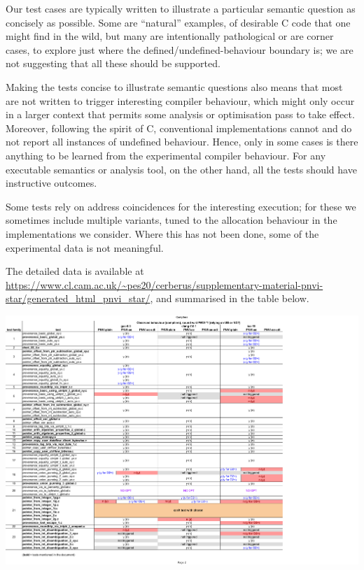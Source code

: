 \documentclass[acmsmall,review,screen]{acmart}\settopmatter{printfolios=true,printccs=false,printacmref=false}
\begin{document}
Our test cases are typically written to illustrate a particular
semantic question as concisely as possible. Some are ``natural''
examples, of desirable C code that one might find in the wild, but
many are intentionally pathological or are corner cases, to explore
just where the defined/undefined-behaviour boundary is; we are not
suggesting that all these should be supported.

Making the tests concise to illustrate semantic questions also means
that most are not written to trigger interesting compiler behaviour,
which might only occur in a larger context that permits some analysis
or optimisation pass to take effect. Moreover, following the spirit of
C, conventional implementations cannot and do not report all instances
of undefined behaviour. Hence, only in some cases is there anything to
be learned from the experimental compiler behaviour. For any
executable semantics or analysis tool, on the other hand, all the
tests should have instructive outcomes.

Some tests rely on address coincidences for the interesting execution;
for these we sometimes include multiple variants, tuned to the
allocation behaviour in the implementations we consider. Where this
has not been done, some of the experimental data is not meaningful.

The detailed data is available at
\url{https://www.cl.cam.ac.uk/~pes20/cerberus/supplementary-material-pnvi-star/generated_html_pnvi_star/},
and summarised in the table below.

\noindent
\includegraphics[width=1.25\textwidth]{tests_compilers.pdf}


\newpage

\makeatletter
\setlength{}
\setlength{\@ACM@labelwidth}{6.5pt}
\makeatother

\end{document}
